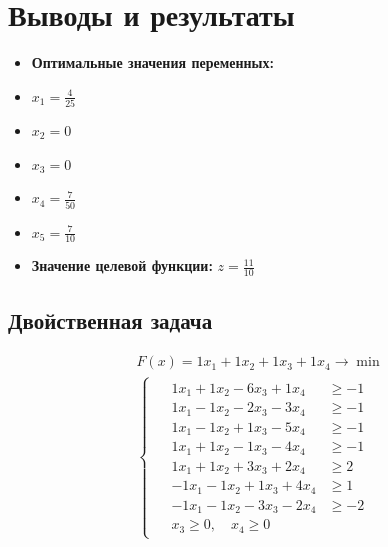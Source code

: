 \section*{Выводы и результаты}
\begin{itemize}
\item \textbf{Оптимальные значения переменных:}
\item $x_{1} = \frac{4}{25}$
\item $x_{2} = 0$
\item $x_{3} = 0$
\item $x_{4} = \frac{7}{50}$
\item $x_{5} = \frac{7}{10}$
\item \textbf{Значение целевой функции:} $z = \frac{11}{10}$
\end{itemize}




\newpage
\subsection*{Двойственная задача}
\begin{equation}
\begin{matrix}
    F(x) = 1x_1 + 1x_2 + 1x_3 + 1x_4 \to \min \\
    \begin{cases}
    \begin{aligned}
        & 1x_1 + 1x_2 -6x_3 + 1x_4 & \geq -1 \\
        & 1x_1 -1x_2 -2x_3 -3x_4 & \geq -1 \\
        & 1x_1 -1x_2 + 1x_3 -5x_4 & \geq -1 \\
        & 1x_1 + 1x_2 -1x_3 -4x_4 & \geq -1 \\
        & 1x_1 + 1x_2 + 3x_3 + 2x_4 & \geq 2 \\
        & -1x_1 -1x_2 + 1x_3 + 4x_4 & \geq 1 \\
        & -1x_1 -1x_2 -3x_3 -2x_4 & \geq -2 \\
        & x_3 \geq 0, \quad x_4 \geq 0
    \end{aligned}
    \end{cases}
\end{matrix}
\end{equation}




